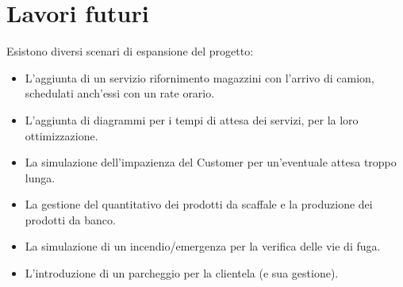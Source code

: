 \documentclass{article}
\begin{document}
\section{Lavori futuri}
Esistono diversi scenari di espansione del progetto:
\begin{itemize}
\item L'aggiunta di un servizio rifornimento magazzini con l'arrivo di camion, schedulati anch'essi con un rate orario.
\item L'aggiunta di diagrammi per i tempi di attesa dei servizi, per la loro ottimizzazione.
\item La simulazione dell'impazienza del Customer per un'eventuale attesa troppo lunga.
\item La gestione del quantitativo dei prodotti da scaffale e la produzione dei prodotti da banco. 
\item La simulazione di un incendio/emergenza per la verifica delle vie di fuga. 
\item L'introduzione di un parcheggio per la clientela (e sua gestione).
\end{itemize}
\end{document}
